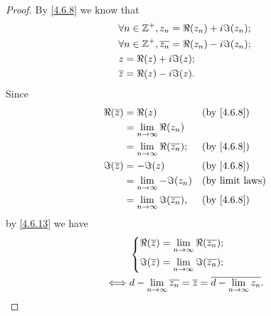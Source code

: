 \begin{proof}
  By \cref{4.6.8} we know that
  \begin{align*}
     & \forall n \in \mathbb{Z}^+, z_n = \Re(z_n) + i \Im(z_n);            \\
     & \forall n \in \mathbb{Z}^+, \overline{z_n} = \Re(z_n) - i \Im(z_n); \\
     & z = \Re(z) + i \Im(z);                                      \\
     & \overline{z} = \Re(z) - i \Im(z).
  \end{align*}
  Since
  \begin{align*}
    \Re(\overline{z}) & = \Re(z)                                   &  & \by{4.6.8}             \\
                      & = \lim_{n \to \infty} \Re(z_n)                                         \\
                      & = \lim_{n \to \infty} \Re(\overline{z_n}); &  & \by{4.6.8}             \\
    \Im(\overline{z}) & = -\Im(z)                                  &  & \by{4.6.8}             \\
                      & = \lim_{n \to \infty} -\Im(z_n)            &  & \text{(by limit laws)} \\
                      & = \lim_{n \to \infty} \Im(\overline{z_n}), &  & \by{4.6.8}
  \end{align*}
  by \cref{4.6.13} we have
  \begin{align*}
         & \begin{dcases}
             \Re(\overline{z}) = \lim_{n \to \infty} \Re(\overline{z_n}); \\
             \Im(\overline{z}) = \lim_{n \to \infty} \Im(\overline{z_n});
           \end{dcases}                                    \\
    \iff & d - \lim_{n \to \infty} \overline{z_n} = \overline{z} = \overline{d - \lim_{n \to \infty} z_n}.
  \end{align*}


\end{proof}
